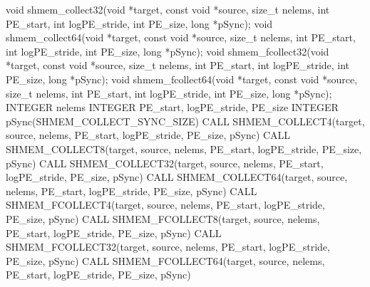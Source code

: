 \synC   %
void shmem_collect32(void *target, const void *source, size_t nelems, int PE_start, int logPE_stride, int PE_size, long *pSync);
void shmem_collect64(void *target, const void *source, size_t nelems, int PE_start, int logPE_stride, int PE_size, long *pSync);
void shmem_fcollect32(void *target, const void *source,	size_t nelems, int PE_start, int logPE_stride, int PE_size, long *pSync);
void shmem_fcollect64(void *target, const void *source,	size_t nelems, int PE_start, int logPE_stride, int PE_size, long *pSync);
\synF   %
INTEGER nelems
INTEGER PE_start, logPE_stride, PE_size
INTEGER pSync(SHMEM_COLLECT_SYNC_SIZE)
CALL SHMEM_COLLECT4(target, source, nelems, PE_start, logPE_stride, PE_size, pSync)
CALL SHMEM_COLLECT8(target, source, nelems, PE_start, logPE_stride, PE_size, pSync)
CALL SHMEM_COLLECT32(target, source, nelems, PE_start, logPE_stride, PE_size, pSync)
CALL SHMEM_COLLECT64(target, source, nelems, PE_start, logPE_stride, PE_size, pSync)
CALL SHMEM_FCOLLECT4(target, source, nelems, PE_start, logPE_stride, PE_size, pSync)
CALL SHMEM_FCOLLECT8(target, source, nelems, PE_start, logPE_stride, PE_size, pSync)
CALL SHMEM_FCOLLECT32(target, source, nelems, PE_start, logPE_stride, PE_size, pSync)
CALL SHMEM_FCOLLECT64(target, source, nelems, PE_start, logPE_stride, PE_size, pSync)

